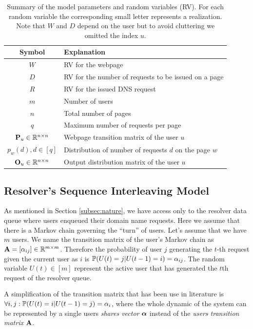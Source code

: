 	\begin{table}
		\centering
		\begin{tabular}{|c|l}
			\hline
			Symbol & Explanation \\ 
			\hline 
			$W$ & RV for the webpage \\ \hline
			$D$ & RV for the number of requests to be issued on a page \\ \hline
			$R$ & RV for the issued DNS request \\ \hline
			\hline 
			$m$ & Number of users \\ \hline
			$n$ & Total number of pages \\ \hline
			$q$ & Maximum number of requests per page \\ \hline 
			\hline 
			$\mathbf{P}_u \in \mathbb R^{n \times n}$ & Webpage transition matrix of the user $u$ \\ \hline 
			$p_w(d), d \in [q]$ & Distribution of number of requests $d$ on the page $w$ \\ \hline 
			$\mathbf{O}_u \in \mathbb R^{n \times n}$ & Output distribution matrix of the user $u$  \\ \hline
		\end{tabular}
		\caption{Summary of the model parameters and random variables (RV). For each random variable the corresponding small letter represents a realization. Note that $W$ and $D$ depend on the user but to avoid cluttering we omitted the index $u$.}
		\label{tab:params}
	\end{table}
	
	\subsection{Resolver's Sequence Interleaving Model}
	\label{subsec:interle}
	As mentioned in Section \ref{subsec:nature}, we have access only to the resolver data queue where users enqueued their domain name requests. 
	Here we assume that there is a Markov chain governing the ``turn'' of users. 
	Let's assume that we have $m$ users.
	We name the transition matrix of the user's Markov chain as $\mathbf{A} = [\alpha_{ij}] \in \mathbb R^{m \times m}$.
	Therefore the probability of user $j$ generating the $t$-th request given the current user as $i$ is $\mathbb{P}(U(t)=j|U(t-1)=i) = \alpha_{ij}$.
	The random variable $U(t) \in [m]$ represent the active user that has generated the $t$th request of the resolver queue. 
	
	A simplification of the transition matrix that has been use in literature is $\forall i, j: \mathbb{P}(U(t) = i|U(t-1) = j) = \alpha_i$, where the whole dynamic of the system can be represented by a single users \emph{shares vector} $\boldsymbol{\alpha}$ instead of the \emph{users transition matrix} $\mathbf{A}$.
	
